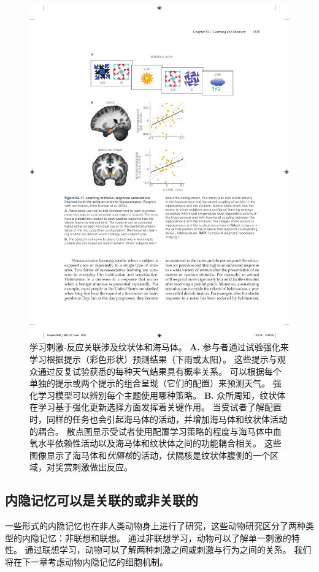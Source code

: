 \begin{figure}[htbp]
	\centering
	\includegraphics[width=0.88\linewidth]{chap52/fig_52_11}
	\caption{学习刺激-反应关联涉及纹状体和海马体\cite{duncan2018more}。
		\textbf{A.} 参与者通过试验强化来学习根据提示（彩色形状）预测结果（下雨或太阳）。
		这些提示与观众通过反复试验获悉的每种天气结果具有概率关系。
		可以根据每个单独的提示或两个提示的组合呈现（它们的配置）来预测天气。
		强化学习模型可以辨别每个主题使用哪种策略。
		\textbf{B.} 众所周知，纹状体在学习基于强化更新选择方面发挥着关键作用。
		当受试者了解配置时，同样的任务也会引起海马体的活动，并增加海马体和纹状体活动的耦合。
		散点图显示受试者使用配置学习策略的程度与海马体中血氧水平依赖性活动以及海马体和纹状体之间的功能耦合相关。
		这些图像显示了海马体和\textit{伏隔核}的活动，伏隔核是纹状体腹侧的一个区域，对奖赏刺激做出反应。}
	\label{fig:52_11}
\end{figure}



\subsection{内隐记忆可以是关联的或非关联的}

一些形式的内隐记忆也在非人类动物身上进行了研究，这些动物研究区分了两种类型的内隐记忆：非联想和联想。
通过非联想学习，动物可以了解单一刺激的特性。
通过联想学习，动物可以了解两种刺激之间或刺激与行为之间的关系。
我们将在下一章考虑动物内隐记忆的细胞机制。


